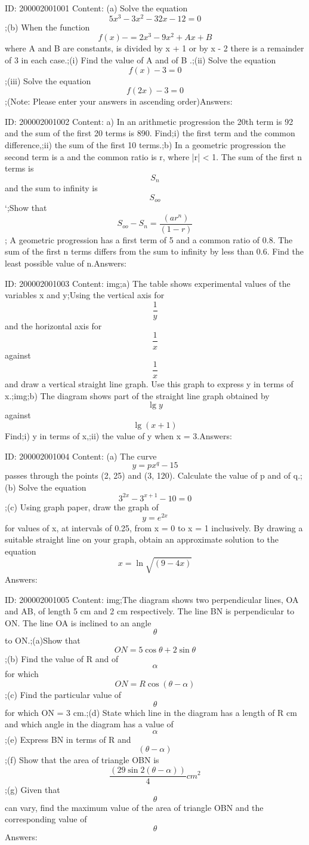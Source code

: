 \documentclass{article}
\begin{document}
ID: 200002001001
Content:
(a)	Solve the equation \[5x^3-3x^2-32x-12=0\];(b) When the function \[f(x)-=2x^3-9x^2+Ax+B\] where A and B are constants, is divided by x + 1 or by x - 2 there is a remainder of 3 in each case.;(i)	Find the value of A and of B .;(ii) Solve the equation \[f(x) - 3 = 0\] ;(iii) Solve the equation \[f(2x) - 3 = 0\];(Note: Please enter your answers in ascending order)Answers:

ID: 200002001002
Content:
a) In an arithmetic progression the 20th term is 92 and the sum of the first 20 terms is 890. Find;i) the first term and the common difference,;ii) the sum of the first 10 terms.;b) In a geometric progression the second term is a and the common ratio is r, where |r| < 1. The sum of the first n terms is \[S_n\] and the sum to infinity is \[S_{oo}\] `;Show that \[S_{oo}-S_n=\frac{(ar^n)}{(1-r)}\]; A geometric progression has a first term of 5 and a common ratio of 0.8. The sum of the first n terms differs from the sum to infinity by less than 0.6. Find the least possible value of n.Answers:

ID: 200002001003
Content:
img;a) The table shows experimental values of the variables x and y;Using the vertical axis for \[\frac{1}{y}\] and the horizontal axis for \[\frac{1}{x}\]against \[\frac{1}{x}\] and draw a vertical straight line graph. Use this graph to express y in terms of x.;img;b) The diagram shows part of the straight line graph obtained by \[\lg y\] against \[\lg(x + 1)\] Find;i) y in terms of x,;ii) the value of y when x = 3.Answers:

ID: 200002001004
Content:
(a)	The curve  \[y=px^q-15\] passes through the points (2, 25) and (3, 120). Calculate the value of p and of q.;(b)	Solve the equation \[3^{2x}-3^{x+1}-10=0\];(c)	Using graph paper, draw the graph of \[y=e^{2x}\] for values of x, at intervals of 0.25, from x = 0 to x = 1 inclusively. By drawing a suitable straight line on your graph, obtain an approximate solution to the equation \[x=\ln \sqrt{(9-4x)}\]Answers:

ID: 200002001005
Content:
img;The diagram shows two perpendicular lines, OA and AB, of length 5 cm and 2 cm respectively. The line BN is perpendicular to ON. The line OA is inclined to an angle \[\theta\] to ON.;(a)Show that \[ON=5\cos\theta + 2\sin\theta\];(b)	Find the value of R and of \[\alpha\] for which \[ON=R\cos(\theta-\alpha)\];(c)	Find the particular value of \[\theta\] for which ON = 3 cm.;(d) State which line in the diagram has a length of R cm and which angle in the diagram has a value of \[\alpha\];(e)	Express BN in terms of R and \[(\theta-\alpha)\];(f) Show that the area of triangle OBN is \[\frac{(29\sin 2(\theta-\alpha))}{4}cm^2\];(g) Given that \[\theta\] can vary, find the maximum value of the area of triangle OBN and the corresponding value of \[\theta\]Answers:
\end{document}
